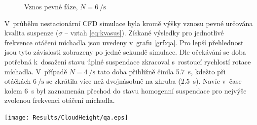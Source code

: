 \begin{figure}[h!]
 \centering
  \qquad 
  \caption{Vznos pevné fáze, $N=\SI{6}{\per\second}$}
  \label{fig:h-w10-6s}
\end{figure}
\newpage

V~průběhu nestacionární CFD simulace byla kromě výšky vznosu pevné určována kvalita suspenze ($\sigma$ -- vztah \ref{eq:kvasus}). Získané výsledky pro jednotlivé frekvence otáčení míchadla jsou uvedeny v~grafu \ref{grf:qa}. Pro lepší přehlednost jsou tyto závislosti zobrazeny po jedné sekundě simulace. Dle očekávání se doba potřebná k~dosažení stavu úplné suspendace zkracoval s~rostoucí rychlostí rotace míchadla. V~případě $N=\SI{4}{\per\second}$ tato doba přibližně činila \SI{5.7}{\second}, kdežto při otáčkách $\SI{6}{\per\second}$ se zkrátila více než dvojnásobně na zhruba (\SI{2.5}{\second}). Navíc v~čase kolem \SI{6}{\second} byl zaznamenán přechod do stavu homogenní suspendace pro nejvýše zvolenou frekvenci otáčení míchadla. 

\begin{grf}[h!]
 \centering
  \texttt{[image: Results/CloudHeight/qa.eps]}
  \caption{Průběh kvality suspenze}
  \label{grf:qa}
\end{grf}

